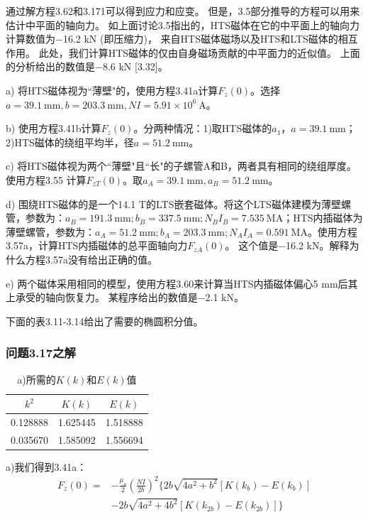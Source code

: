 通过解方程3.62和3.171可以得到应力和应变。
但是，3.5部分推导的方程可以用来估计中平面的轴向力。
如上面讨论3.5指出的，HTS磁体在它的中平面上的轴向力计算数值为−16.2 kN (即压缩力)，
来自HTS磁体磁场以及HTS和LTS磁体的相互作用。
此处，我们计算HTS磁体的仅由自身磁场贡献的中平面力的近似值。
上面的分析给出的数值是−8.6 kN [3.32]。

a) 将HTS磁体视为``薄壁"的，使用方程3.41a计算$F_z(0)$。选择$a=39.1 \ \mathrm{mm}, b=203.3\ \mathrm{mm}, NI =5.91\times 10^6\ \mathrm{A}$。

b) 使用方程3.41b计算$F_z(0)$。分两种情况：1)取HTS磁体的$a_1$，$a=39.1\ \mathrm{mm}$；2)HTS磁体的绕组平均半，径$a=51.2\ \mathrm{mm}$。

c) 将HTS磁体视为两个``薄壁"且``长"的子螺管A和B，两者具有相同的绕组厚度。使用方程3.55
计算$F_{zT}(0)$。取$a_A=39.1\ \mathrm{mm} , a_B=51.2\ \mathrm{mm}$。

d) 围绕HTS磁体的是一个14.1 T的LTS嵌套磁体。将这个LTS磁体建模为薄壁螺管，参数为：$a_B = 191.3\ \mathrm{mm};
b_B= 337.5\ \mathrm{mm}; N_BI_B = 7.535\ \mathrm{MA}$；HTS内插磁体为薄壁螺管，参数为：$a_A = 51.2\ \mathrm{mm}; b_A = 203.3\ \mathrm{mm};
 N_A I_A = 0.591\ \mathrm{MA}$。使用方程3.57a，计算HTS内插磁体的总平面轴向力$F_{zA}(0)$。
 这个值是−16.2 kN。解释为什么方程3.57a没有给出正确的值。

e) 两个磁体采用相同的模型，使用方程3.60来计算当HTS内插磁体偏心5 mm后其上承受的轴向恢复力。
某程序给出的数值是−2.1 kN。

下面的表3.11-3.14给出了需要的椭圆积分值。

\subsubsection{问题3.17之解}
\begin{table}[htbp]\small
\centering
\caption{a)所需的$K(k)$和$E(k)$值}
	\begin{tabular}{|c|c|c|}
		\hline
		$k^2$      & $K(k)$     &$ E(k)$     \\ \hline
		0.128888 & 1.625445 & 1.518888 \\ \hline
		0.035670 & 1.585092 & 1.556694 \\ \hline
	\end{tabular}
\end{table}

a)我们得到3.41a：
\begin{align*}
F_{z}(0)=&-\frac{\mu_{o}}{2}(\frac{NI}{2b})^{2}\{2b\sqrt{4a^{2}+b^{2}}[K(k_{b})-E(k_{b})]\\
&-2b\sqrt{4a^{2}+4b^{2}}[K(k_{2b})-E(k_{2b})]\}\tag{3.41a}
\end{align*}

